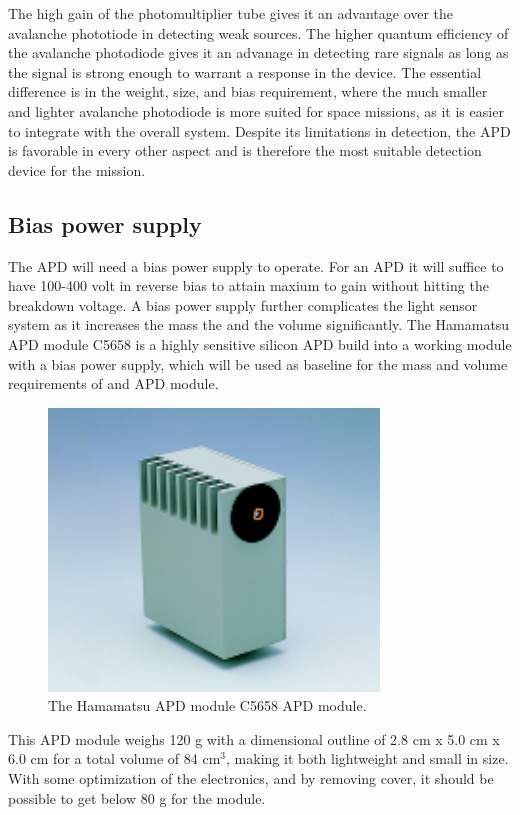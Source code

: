 The high gain of the photomultiplier tube gives it an advantage over the avalanche phototiode in detecting weak sources. The higher quantum efficiency of the avalanche photodiode gives it an advanage in detecting rare signals as long as the signal is strong enough to warrant a response in the device. The essential difference is in the weight, size, and bias requirement, where the much smaller and lighter avalanche photodiode is more suited for space missions, as it is easier to integrate with the overall system. Despite its limitations in detection, the APD is favorable in every other aspect and is therefore the most suitable detection device for the mission.

\subsection{Bias power supply}
The APD will need a bias power supply to operate. For an APD it will suffice to have 100-400 volt in reverse bias to attain maxium to gain without hitting the breakdown voltage. A bias power supply  further complicates the light sensor system as it increases the mass the and the volume significantly. The Hamamatsu APD module C5658 is a highly sensitive silicon APD build into a working module with a bias power supply, which will be used as baseline for the mass and volume requirements of and APD module. 

\begin{figure}[htb]
\begin{center}
\includegraphics[scale=0.8]{figures/RCS/APDmodule}
\caption{The Hamamatsu APD module C5658 APD module.}
\label{fig:APD_module}
\end{center}
\end{figure}

This APD module weighs 120 g with a dimensional outline of 2.8 cm x 5.0 cm x 6.0 cm for a total volume of 84 $\mathrm{cm^3}$, making it both lightweight and small in size. With some optimization of the electronics, and by removing cover, it should be possible to get below 80 g for the module. 

